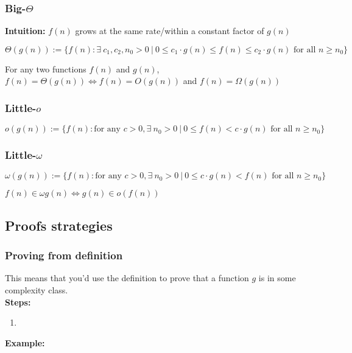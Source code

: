 \documentclass{article}
\begin{document}
        \subsubsection{Big-$\Theta$}
            \textbf{Intuition: }$f(n)$ grows at the same rate/within a constant factor of $g(n)$
            \begin{definition}
                $\Theta(g(n)) := \{ f(n) : \exists ~ c_1, c_2, n_0 > 0 ~|~ 0 \leq c_1 \cdot g(n) \leq f(n) \leq c_2 \cdot g(n) \text{ for all } n \geq  n_0 \}$
            \end{definition}
            \begin{theorem}
                For any two functions $f(n)$ and $g(n)$, $f(n) = \Theta(g(n)) \iff f(n) = O(g(n)) $ and $f(n) = \Omega(g(n))$
            \end{theorem}


        \subsubsection{Little-$o$}
        \begin{definition}
            $o(g(n)) := \{ f(n) : \text{for any }c > 0, \exists ~ n_0 >0 ~|~ 0 \leq f(n) < c \cdot g(n) \text{ for all } n \geq  n_0 \}$
        \end{definition}
        \subsubsection{Little-$\omega$}
        \begin{definition}
            $\omega(g(n)) := \{ f(n) : \text{for any }c > 0, \exists ~ n_0 >0 ~|~ 0 \leq c \cdot g(n) < f(n) \text{ for all } n \geq  n_0 \}$
        \end{definition}
        \begin{theorem}
            $f(n) \in \omega g(n) \iff g(n) \in o(f(n))$
        \end{theorem}

        \subsection{Proofs strategies}
            \subsubsection{Proving from definition}
            This means that you'd use the definition to prove that a function $g$ is in some complexity class.\\
            \textbf{Steps: }
            \begin{enumerate}
                \item 
            \end{enumerate}
            \textbf{Example: }
\end{document}
